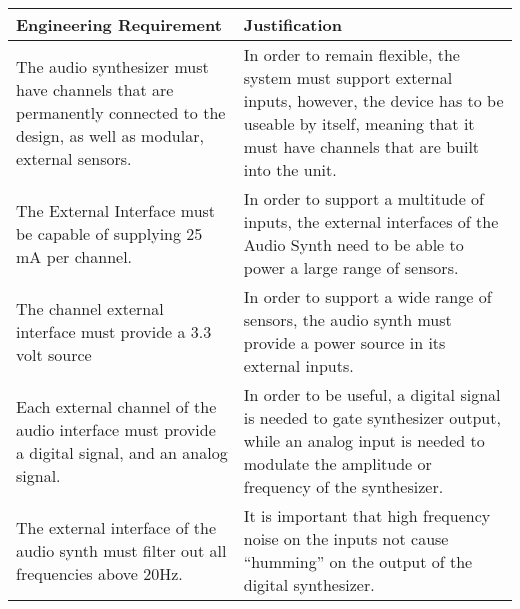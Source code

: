 \documentclass{article}
\begin{document}
\begin{tabular}{|p{3in}|p{3in}|}
\hline
Engineering Requirement & Justification \\
\hline

The audio synthesizer must have channels that are permanently
connected to the design, as well as modular, external sensors. & In
order to remain flexible, the system must support external inputs,
however, the device has to be useable by itself, meaning that it must
have channels that are built into the unit. \\

\hline

The External Interface must be capable of supplying 25 mA per channel.
& In order to support a multitude of inputs, the external interfaces
of the Audio Synth need to be able to power a large range of sensors.\\

\hline

The channel external interface must provide a 3.3 volt source & In
order to support a wide range of sensors, the audio synth must provide
a power source in its external inputs. \\

\hline

Each external channel of the audio interface must provide a digital
signal, and an analog signal. & In order to be useful, a digital
signal is needed to gate synthesizer output, while an analog input is
needed to modulate the amplitude or frequency of the synthesizer.\\

\hline 

The external interface of the audio synth must filter out all
frequencies above 20Hz. & It is important that high frequency noise on
the inputs not cause ``humming'' on the output of the digital
synthesizer.\\

\hline

\end{tabular}
\end{document}
